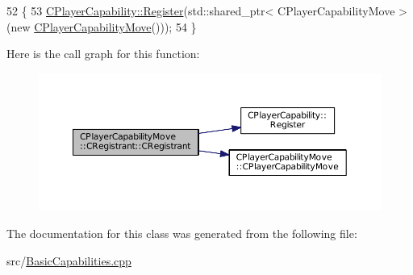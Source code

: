 \begin{DoxyCode}
52                                              \{
53     \hyperlink{classCPlayerCapability_a7e298018dcde2684451add3cfff065f7}{CPlayerCapability::Register}(std::shared\_ptr< CPlayerCapabilityMove >(\textcolor{keyword}{new} 
      \hyperlink{classCPlayerCapabilityMove_a6bfe72663b6b5fc708d23373dc293ec7}{CPlayerCapabilityMove}()));   
54 \}
\end{DoxyCode}
Here is the call graph for this function\+:\nopagebreak
\begin{figure}[H]
\begin{center}
\leavevmode
\includegraphics[width=350pt]{classCPlayerCapabilityMove_1_1CRegistrant_a9ee42fd2028701745555195a2e35922b_cgraph}
\end{center}
\end{figure}


The documentation for this class was generated from the following file\+:\begin{DoxyCompactItemize}
\item 
src/\hyperlink{BasicCapabilities_8cpp}{Basic\+Capabilities.\+cpp}\end{DoxyCompactItemize}

